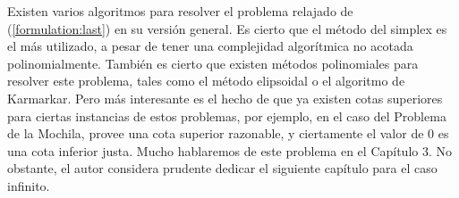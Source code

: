 Existen varios algoritmos para resolver el problema relajado de (\ref{formulation:last}) en su
versión general. Es cierto que el método del simplex es el más utilizado, a pesar de tener una
complejidad algorítmica no acotada polinomialmente. También es cierto que existen métodos
polinomiales para resolver este problema, tales como el método elipsoidal o el algoritmo de
Karmarkar. Pero más interesante es el hecho de que ya existen cotas superiores para ciertas
instancias de estos problemas, por ejemplo, en el caso del Problema de la Mochila, \cite{martello}
provee una cota superior razonable, y ciertamente el valor de 0 es una cota inferior justa. Mucho
hablaremos de este problema en el Capítulo 3. No obstante, el autor considera prudente dedicar el
siguiente capítulo para el caso infinito.
